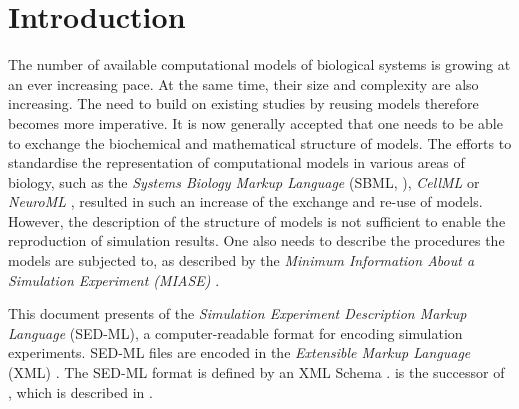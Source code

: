 \chapter{Introduction}

The number of available computational models of biological systems is growing at an ever increasing pace. 
At the same time, their size and complexity are also increasing. The need to build on existing studies by reusing models therefore becomes more imperative. 
It is now generally accepted that one needs to be able to exchange the biochemical and mathematical structure of models. 
The efforts to standardise the representation of computational models in various areas of biology, such as the \emph{Systems Biology Markup Language} (SBML, \citep{Hucka:2003}), \emph{CellML} \citep{cuellar:2003} or \emph{NeuroML} \citep{Goddard:2001}, resulted in such an increase of the exchange and re-use of models. 
However, the description of the structure of models is not sufficient to enable the reproduction of simulation results.  
One also needs to describe the procedures the models are subjected to, as described by the \emph{Minimum Information About a Simulation Experiment (MIASE)} \citep{Waltemath:2011}. 

This document presents  \LoneVtwo of the \emph{Simulation Experiment Description Markup Language} (SED-ML), a computer-readable format for encoding simulation experiments. 
SED-ML files are encoded in the \emph{Extensible Markup Language} (XML) \citep{Bray:2006}. The SED-ML format is defined by an XML Schema \citep{Fallside:2001}. 
\LoneVtwo is the successor of \LoneVone, which is described in \citep{WAB+11}.





